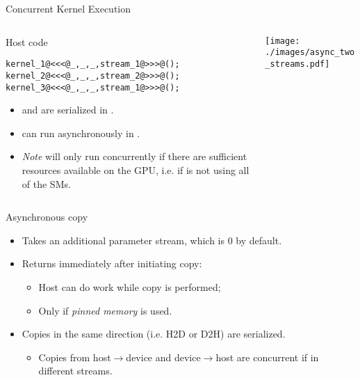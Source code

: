 \documentclass[aspectratio=43]{beamer}
\begin{document}
\begin{frame}[fragile]{Concurrent Kernel Execution}
    \begin{columns}[T]
        \begin{column}{0.45\textwidth}
            \begin{codecolumn}{Host code}
                \begin{lstlisting}[style=boxcudatiny]
kernel_1@<<<@_,_,_,stream_1@>>>@();
kernel_2@<<<@_,_,_,stream_2@>>>@();
kernel_3@<<<@_,_,_,stream_1@>>>@();
                \end{lstlisting}
            \end{codecolumn}
            \begin{itemize}
                \item \footnotesize {} and  are serialized in .
                \item {} can run asynchronously in .
                \item \emph{Note}  will only run concurrently if there are sufficient resources available on the GPU, i.e. if  is not using all of the SMs.
            \end{itemize}
        \end{column}
        \begin{column}{0.6\textwidth}
            \texttt{[image: ./images/async\_two\_streams.pdf]}
        \end{column}
    \end{columns}
\end{frame}

\begin{frame}[fragile]{Asynchronous copy}

    \centering {}
    \begin{itemize}
        \item Takes an additional parameter stream, which is 0 by default.
        \item Returns immediately after initiating copy:
        \begin{itemize}
            \item Host can do work while copy is performed;
            \item Only if \emph{pinned memory} is used.
        \end{itemize}
        \item Copies in the same direction (i.e. H2D or D2H) are serialized.
        \begin{itemize}
            \item Copies from host$\rightarrow$device and device$\rightarrow$host are concurrent if in different streams.
        \end{itemize}
    \end{itemize}

\end{frame}
\end{document}
